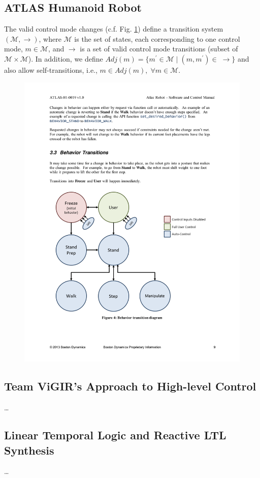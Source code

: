 
\subsection{ATLAS Humanoid Robot}

The valid control mode changes (c.f. Fig. \ref{Fig:ControlModeTS}) define a transition system $(\mathcal{M}, \boldsymbol\rightarrow)$, where $\mathcal{M}$ is the set of states, each corresponding to one control mode, $m \in \mathcal{M}$, and $\boldsymbol\rightarrow$ is a set of valid control mode transitions (subset of $\mathcal{M} \times \mathcal{M}$).
In addition, we define $Adj(m) = \{ m^\prime \in \mathcal{M} \; | \; (m, m^\prime) \in \; \boldsymbol\rightarrow \}$ and also allow self-transitions, i.e., $m \in Adj(m), \; \forall m \in \mathcal{M}$.

\begin{figure}[t]
\centering
\includegraphics[width=0.95\columnwidth,clip]{./img/control_modes_ts.pdf}
\caption{
}
\label{Fig:ControlModeTS}
\end{figure}

\subsection{Team ViGIR's Approach to High-level Control}

\ldots

\subsection{Linear Temporal Logic and Reactive LTL Synthesis}

\ldots